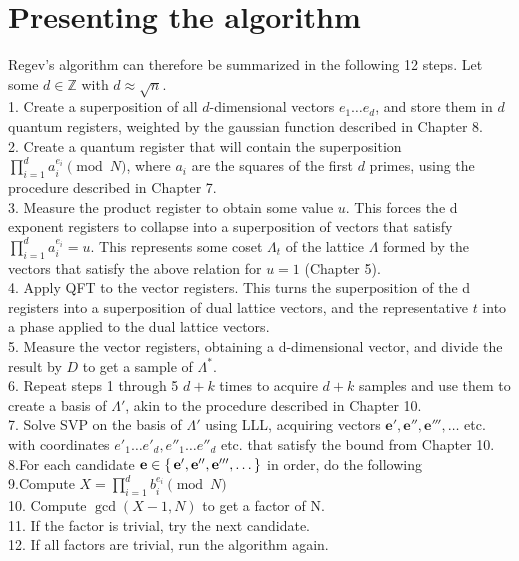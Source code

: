 \chapter{Presenting the algorithm}

Regev's algorithm can therefore be summarized in the following 12 steps. Let some $d \in \mathbb{Z}$ with $d \approx \sqrt{n}$.\\

1. Create a superposition of all $d$-dimensional vectors $e_1 \dots e_d$, and store them in $d$ quantum registers, weighted by the gaussian function described in Chapter 8.\\
2. Create a quantum register that will contain the superposition $\prod_{i=1}^d a_i^{e_i} \pmod N$, where $a_i$ are the squares of the first $d$ primes, using the procedure described in Chapter 7.\\
3. Measure the product register to obtain some value $u$. This forces the d exponent registers to collapse into a superposition of vectors that satisfy $\prod_{i=1}^d a_i^{e_i} =u$. This represents some coset $\mathit {\Lambda}_t$ of the lattice $\mathit \Lambda$ formed by the vectors that satisfy the above relation for $u = 1$ (Chapter 5).\\
4. Apply QFT to the vector registers. This turns the superposition of the d registers into a superposition of dual lattice vectors, and the representative $t$ into a phase applied to the dual lattice vectors.\\
5. Measure the vector registers, obtaining a d-dimensional vector, and divide the result by $D$ to get a sample of $\Lambda^*$.\\
6. Repeat steps 1 through 5 $d+k$ times to acquire $d+k$ samples and use them to create a basis of $\Lambda'$, akin to the procedure described in Chapter 10.\\
7. Solve SVP on the basis of $\mathit \Lambda'$ using LLL, acquiring vectors $\mathbf{e',e'',e''',}\dots$ etc. with coordinates $e'_1 \dots e'_d, e''_1\dots e''_d$ etc. that satisfy the bound from Chapter 10.\\
8.For each candidate $\mathbf{e} \in \set{\mathbf{e',e'',e''',\dots}}$ in order, do the following\\
9.Compute $X = \prod_{i=1}^d b_i^{e_{i}} \pmod N$\\
10. Compute $\gcd(X-1,N)$ to get a factor of N.\\
11. If the factor is trivial, try the next candidate.\\
12. If all factors are trivial, run the algorithm again.



